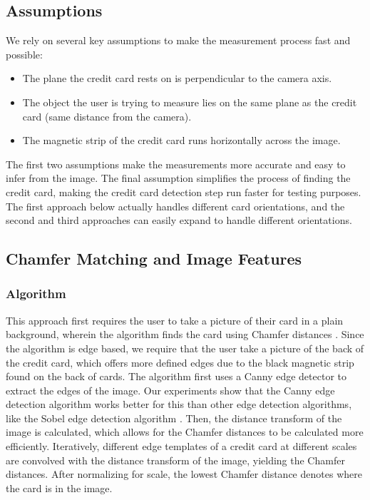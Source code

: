 \documentclass[10pt,twocolumn,letterpaper]{article}
\begin{document}
\subsection{Assumptions}

	We rely on several key assumptions to make the measurement process fast and possible:

\begin{itemize}
\item The plane the credit card rests on is perpendicular to the camera axis.
\item The object the user is trying to measure lies on the same plane as the credit card (same distance from the camera). 
\item The magnetic strip of the credit card runs horizontally across the image.
\end{itemize}

The first two assumptions make the measurements more accurate and easy to infer from the image. The final assumption simplifies the process of finding the credit card, making the credit card detection step run faster for testing purposes. The first approach below actually handles different card orientations, and the second and third approaches can easily expand to handle different orientations. 

\subsection{Chamfer Matching and Image Features}
\subsubsection{Algorithm}

This approach first requires the user to take a picture of their card in a plain background, wherein the algorithm finds the card using Chamfer distances \cite{chamfer}. Since the algorithm is edge based, we require that the user take a picture of the back of the credit card, which offers more defined edges due to the black magnetic strip found on the back of cards. The algorithm first uses a Canny edge detector to extract the edges of the image. Our experiments show that the Canny edge detection algorithm works better for this than other edge detection algorithms, like the Sobel edge detection algorithm \cite{canny}. Then, the distance transform of the image is calculated, which allows for the Chamfer distances to be calculated more efficiently. Iteratively, different edge templates of a credit card at different scales are convolved with the distance transform of the image, yielding the Chamfer distances. After normalizing for scale, the lowest Chamfer distance denotes where the card is in the image.
\end{document}
